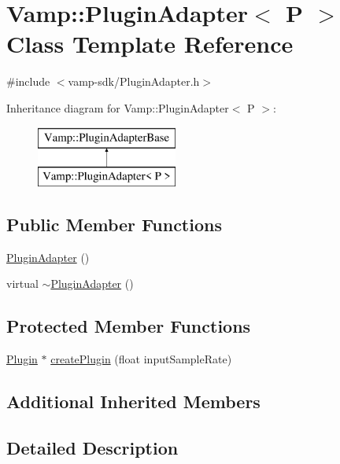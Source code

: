 \hypertarget{class_vamp_1_1_plugin_adapter}{}\section{Vamp\+:\+:Plugin\+Adapter$<$ P $>$ Class Template Reference}
\label{class_vamp_1_1_plugin_adapter}


{\ttfamily \#include $<$vamp-\/sdk/\+Plugin\+Adapter.\+h$>$}

Inheritance diagram for Vamp\+:\+:Plugin\+Adapter$<$ P $>$\+:\begin{figure}[H]
\begin{center}
\leavevmode
\includegraphics[height=2.000000cm]{class_vamp_1_1_plugin_adapter}
\end{center}
\end{figure}
\subsection*{Public Member Functions}
\begin{DoxyCompactItemize}
\item 
\hyperlink{class_vamp_1_1_plugin_adapter_a16312efd629b7063d7b6d67889a2c15a}{Plugin\+Adapter} ()
\item 
virtual \hyperlink{class_vamp_1_1_plugin_adapter_a9612c9df7d4844959a36921d43d4bd50}{$\sim$\+Plugin\+Adapter} ()
\end{DoxyCompactItemize}
\subsection*{Protected Member Functions}
\begin{DoxyCompactItemize}
\item 
\hyperlink{class_vamp_1_1_plugin}{Plugin} $\ast$ \hyperlink{class_vamp_1_1_plugin_adapter_a3f387e7e37409e00d32477903b5b13d3}{create\+Plugin} (float input\+Sample\+Rate)
\end{DoxyCompactItemize}
\subsection*{Additional Inherited Members}


\subsection{Detailed Description}

